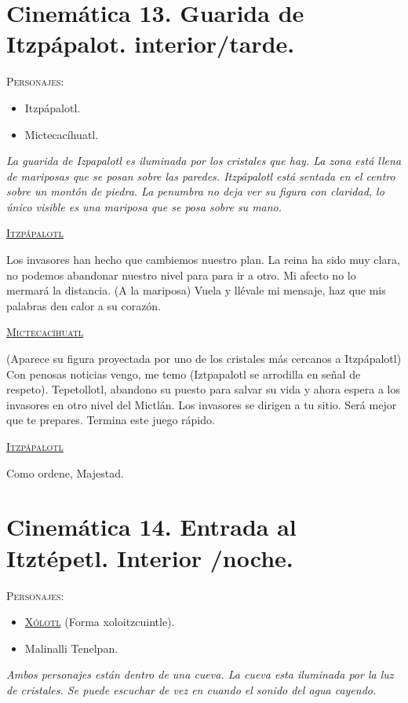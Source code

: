 \documentclass[11pt,letterpaper]{article}
\begin{document}
\section{Cinemática 13. Guarida de Itzpápalot. interior/tarde.}
 \textsc{Personajes}:
 \begin{itemize}
 \item Itzpápalotl.
 \item Mictecacíhuatl.
 \end{itemize}
 \textit{La guarida de Izpapalotl es iluminada por los cristales que hay. La zona está llena de mariposas que se posan sobre las paredes. Itzpápalotl está sentada en el centro sobre un montón de piedra. La penumbra no deja ver su figura con claridad, lo único visible es una mariposa que se posa sobre su mano.}
 \begin{center}
 \textsc{\underline{Itzpápalotl}}
 \\
\par
Los invasores han hecho que cambiemos nuestro plan. La reina ha sido muy clara, no podemos abandonar nuestro nivel para para ir a otro. Mi afecto no lo mermará la distancia. (A la mariposa) Vuela y llévale mi mensaje, haz que mis palabras den calor a su corazón.
\\
\par
\textsc{\underline{Mictecacíhuatl}}
\\
\par
(Aparece su figura proyectada por uno de los cristales más cercanos a Itzpápalotl) Con penosas noticias vengo, me temo (Iztpapalotl se arrodilla en señal de respeto). Tepetollotl, abandono su puesto para salvar su vida y ahora espera a los invasores en otro nivel del Mictlán. Los invasores se dirigen a tu sitio. Será mejor que te prepares. Termina este juego rápido.
\\
\par
\textsc{\underline{Itzpápalotl}}
\\
\par
Como ordene, Majestad. 
 \end{center}
 
\section{Cinemática 14. Entrada al Itztépetl. Interior /noche.}
 \textsc{Personajes}:
 \begin{itemize}
 \item \textsc{\underline{Xólotl}} (Forma xoloitzcuintle).
 \item Malinalli Tenelpan.

 \end{itemize}
 \textit{Ambos personajes están dentro de una cueva.  La cueva esta iluminada por la luz de cristales. Se puede escuchar de vez en cuando el sonido del agua cayendo. }
\end{document}
